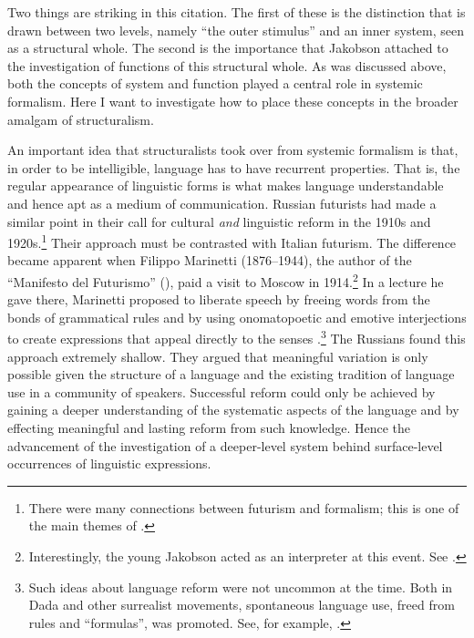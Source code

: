 \documentclass[output=paper]{langscibook}
\begin{document}
Two things are striking in this citation. The first of these is the distinction that is drawn between two levels, namely ``the outer stimulus'' and an inner system, seen as a structural whole. The second is the importance that Jakobson attached to the investigation of functions of this structural whole. As was discussed above, both the concepts of system and function played a central role in systemic formalism. Here I want to investigate how to place these concepts in the broader amalgam of structuralism.

An important idea that structuralists took over from systemic formalism is that, in order to be intelligible, language has to have recurrent properties. That is, the regular appearance of linguistic forms is what makes language understandable and hence apt as a medium of communication. Russian futurists had made a similar point in their call for cultural \emph{and} linguistic reform in the 1910s and 1920s.\footnote{There were many connections between futurism and formalism; this is one of the main themes of \citet{Toman1995}.} Their approach must be contrasted with Italian futurism. The difference became apparent when Filippo Marinetti (1876--1944), the author of the ``Manifesto del Futurismo'' (\citeyear{Marinetti1909}), paid a visit to Moscow in 1914.\footnote{Interestingly, the young Jakobson acted as an interpreter at this event. See \citet[17]{Toman1995}.} In a lecture he gave there, Marinetti proposed to liberate speech by freeing words from the bonds of grammatical rules and by using onomatopoetic and emotive interjections to create expressions that appeal directly to the senses \citep[87--88]{Gasparov2014}.\footnote{Such ideas about language reform were not uncommon at the time. Both in Dada and other surrealist movements, spontaneous language use, freed from rules and ``formulas'', was promoted. See, for example, \citet{Spaendonck1977}.} The Russians found this approach extremely shallow. They argued that meaningful variation is only possible given the structure of a language and the existing tradition of language use in a community of speakers. Successful reform could only be achieved by gaining a deeper understanding of the systematic aspects of the language and by effecting meaningful and lasting reform from such knowledge. Hence the advancement of the investigation of a deeper-level system behind surface-level occurrences of linguistic expressions. 
\end{document}
